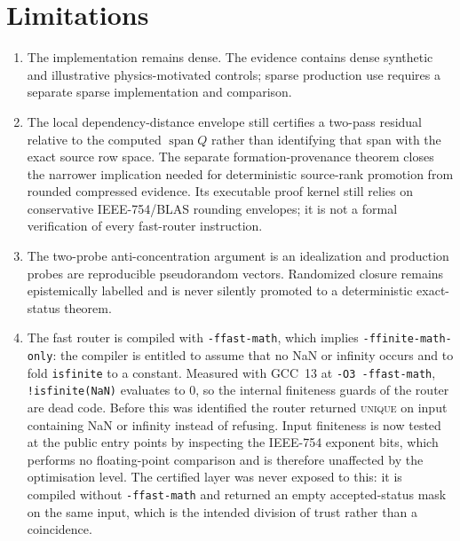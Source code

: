 \documentclass[11pt]{article}
\theoremstyle{definition}
\begin{document}
\section{Limitations}
\begin{enumerate}
\item The implementation remains dense. The evidence contains dense synthetic and illustrative physics-motivated controls; sparse production use requires a separate sparse implementation and comparison.
\item The local dependency-distance envelope still certifies a two-pass residual relative to the computed $\operatorname{span}Q$ rather than identifying that span with the exact source row space. The separate formation-provenance theorem closes the narrower implication needed for deterministic source-rank promotion from rounded compressed evidence. Its executable proof kernel still relies on conservative IEEE-754/BLAS rounding envelopes; it is not a formal verification of every fast-router instruction.
\item The two-probe anti-concentration argument is an idealization and production probes are reproducible pseudorandom vectors. Randomized closure remains epistemically labelled and is never silently promoted to a deterministic exact-status theorem.
\item The fast router is compiled with \texttt{-ffast-math}, which implies
\texttt{-ffinite-math-only}: the compiler is entitled to assume that no NaN or
infinity occurs and to fold \texttt{isfinite} to a constant.  Measured with
GCC~13 at \texttt{-O3 -ffast-math}, \texttt{!isfinite(NaN)} evaluates to $0$,
so the internal finiteness guards of the router are dead code.  Before this was
identified the router returned \textsc{unique} on input containing NaN or
infinity instead of refusing.  Input finiteness is now tested at the public
entry points by inspecting the IEEE-754 exponent bits, which performs no
floating-point comparison and is therefore unaffected by the optimisation
level.  The certified layer was never exposed to this: it is compiled without
\texttt{-ffast-math} and returned an empty accepted-status mask on the same
input, which is the intended division of trust rather than a coincidence.


\end{enumerate}
\end{document}
